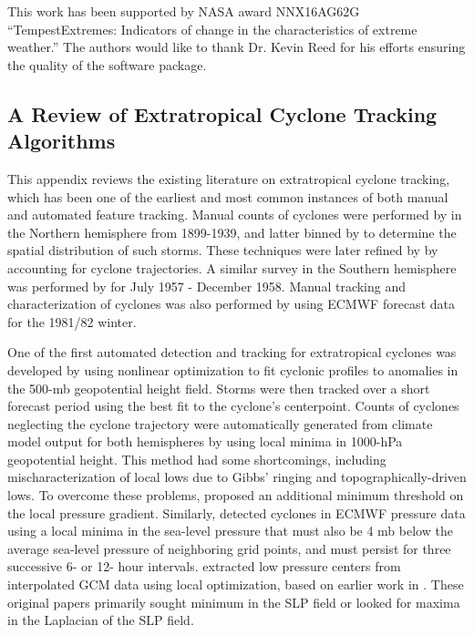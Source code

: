 \documentclass[gmdd, hvmath, online]{copernicus_discussions}
\begin{document}
\pagebreak
\begin{acknowledgements}
This work has been supported by NASA award NNX16AG62G ``TempestExtremes: Indicators of change in the characteristics of extreme weather.''  The authors would like to thank Dr. Kevin Reed for his efforts ensuring the quality of the software package.
\end{acknowledgements}
\pagebreak


\appendix
\subsection{A Review of Extratropical Cyclone Tracking Algorithms} \label{sec:ExtratropicalCycloneAlgorithms}

This appendix reviews the existing literature on extratropical cyclone tracking, which has been one of the earliest and most common instances of both manual and automated feature tracking.  Manual counts of cyclones were performed by \cite{petterssen1956weather} in the Northern hemisphere from 1899-1939, and latter binned by \cite{klein1957principle} to determine the spatial distribution of such storms.  These techniques were later refined by \cite{whittaker1982atlas} by accounting for cyclone trajectories.  A similar survey in the Southern hemisphere was performed by \cite{taljaard1967development} for July 1957 - December 1958.  Manual tracking and characterization of cyclones was also performed by \cite{akyildiz1985systematic} using ECMWF forecast data for the 1981/82 winter.

One of the first automated detection and tracking for extratropical cyclones was developed by \cite{williamson1981storm} using nonlinear optimization to fit cyclonic profiles to anomalies in the 500-mb geopotential height field.  Storms were then tracked over a short forecast period using the best fit to the cyclone's centerpoint.  Counts of cyclones neglecting the cyclone trajectory were automatically generated from climate model output for both hemispheres by \cite{lambert1988cyclone} using local minima in 1000-hPa geopotential height.  This method had some shortcomings, including mischaracterization of local lows due to Gibbs' ringing and topographically-driven lows.  To overcome these problems, \cite{alpert1990climatological} proposed an additional minimum threshold on the local pressure gradient.  Similarly, \cite{le1990comparison} detected cyclones in ECMWF pressure data using a local minima in the sea-level pressure that must also be 4 mb below the average sea-level pressure of neighboring grid points, and must persist for three successive 6- or 12- hour intervals.  \cite{murray1991numerical} extracted low pressure centers from interpolated GCM data using local optimization, based on earlier work in \cite{rice1982durivation}.  These original papers primarily sought minimum in the SLP field or looked for maxima in the Laplacian of the SLP field.
\end{document}
